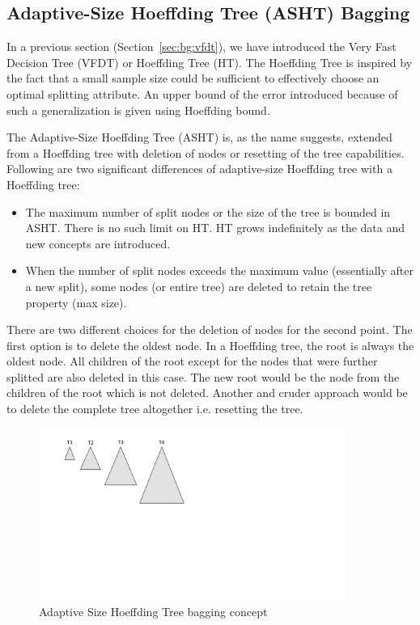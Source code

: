 \subsection{Adaptive-Size Hoeffding Tree (ASHT) Bagging}
\label{sec:bg:asht}
In a previous section (Section~\ref{sec:bg:vfdt}), we have introduced the Very Fast Decision Tree (VFDT) or Hoeffding Tree (HT). The Hoeffding Tree is inspired by the fact that a small sample size could be sufficient to effectively choose an optimal splitting attribute. An upper bound of the error introduced because of such a generalization is given using Hoeffding bound.

The Adaptive-Size Hoeffding Tree (ASHT) is, as the name suggests, extended from a Hoeffding tree with deletion of nodes or resetting of the tree capabilities. Following are two significant differences of adaptive-size Hoeffding tree with a Hoeffding tree: 
\begin{itemize}
    \item  The maximum number of split nodes or the size of the tree is bounded in ASHT. There is no such limit on HT. HT grows indefinitely as the data and new concepts are introduced.
    \item When the number of split nodes exceeds the maximum value (essentially after a new split), some nodes (or entire tree) are deleted to retain the tree property (max size).
\end{itemize}
There are two different choices for the deletion of nodes for the second point. The first option is to delete the oldest node. In a Hoeffding tree, the root is always the oldest node. All children of the root except for the nodes that were further splitted are also deleted in this case. The new root would be the node from the children of the root which is not deleted. Another and cruder approach would be to delete the complete tree altogether i.e. resetting the tree. 

\begin{figure}[htbp]
    \begin{center}
        \includegraphics[width=10.0cm]{figs/ashtbagging.pdf}
        \caption{Adaptive Size Hoeffding Tree bagging concept}
        \label{fig:bg:asht}
    \end{center}
\end{figure}

